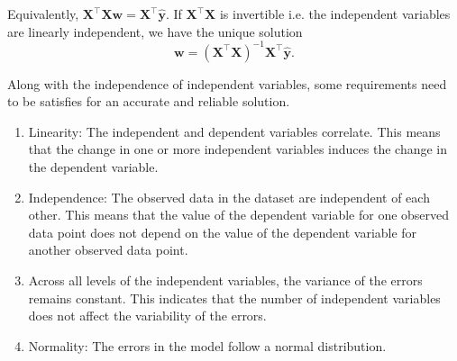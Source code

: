 Equivalently, $\mathbf{X}^\top \mathbf{X} \mathbf{w} =  \mathbf{X}^\top\hat{\mathbf{y}}$. If $\mathbf{X}^\top \mathbf{X}$ is invertible i.e. the independent variables are linearly independent, we have the unique solution
\begin{equation}
 \mathbf{w} = (\mathbf{X}^\top \mathbf{X})^{-1}\mathbf{X}^\top\hat{\mathbf{y}}.
\end{equation}

Along with the independence of independent variables, some requirements need to be satisfies for an accurate and reliable solution.

\begin{enumerate}
 \item  Linearity: The independent and dependent variables correlate. This means that the change in one or more independent variables induces the change in the dependent variable.
 \item Independence: The observed data in the dataset are independent of each other. This means that the value of the dependent variable for one observed data point does not depend on the value of the dependent variable for another observed data point.
 \item Across all levels of the independent variables, the variance of the errors remains constant. This indicates that the number of independent variables does not affect the variability of the errors.
 \item Normality: The errors in the model follow a normal distribution.
\end{enumerate}



